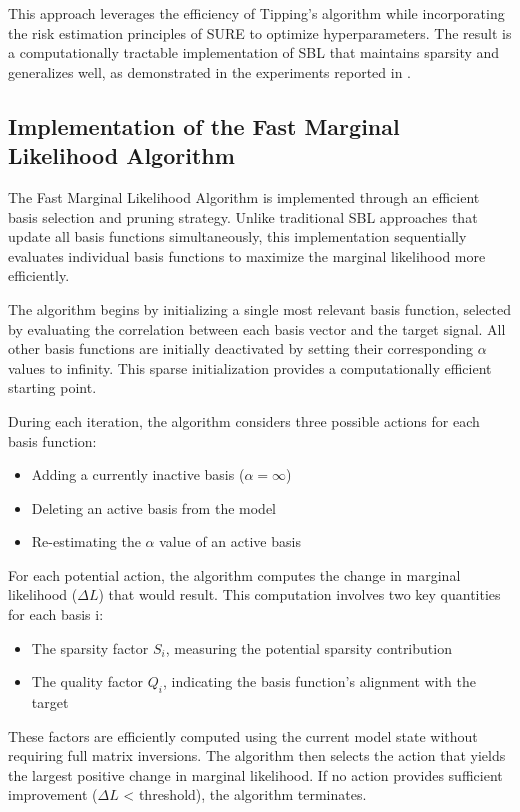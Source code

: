 \documentclass{article}
\begin{document}
This approach leverages the efficiency of Tipping's algorithm while incorporating the risk estimation principles of SURE to optimize hyperparameters. The result is a computationally tractable implementation of SBL that maintains sparsity and generalizes well, as demonstrated in the experiments reported in \cite{tipping2003}.

\subsection{Implementation of the Fast Marginal Likelihood Algorithm}

The Fast Marginal Likelihood Algorithm is implemented through an efficient basis selection and pruning strategy. Unlike traditional SBL approaches that update all basis functions simultaneously, this implementation sequentially evaluates individual basis functions to maximize the marginal likelihood more efficiently.

The algorithm begins by initializing a single most relevant basis function, selected by evaluating the correlation between each basis vector and the target signal. All other basis functions are initially deactivated by setting their corresponding $\alpha$ values to infinity. This sparse initialization provides a computationally efficient starting point.

During each iteration, the algorithm considers three possible actions for each basis function:
\begin{itemize}
\item Adding a currently inactive basis ($\alpha = \infty$)
\item Deleting an active basis from the model
\item Re-estimating the $\alpha$ value of an active basis
\end{itemize}

For each potential action, the algorithm computes the change in marginal likelihood ($\Delta L$) that would result. This computation involves two key quantities for each basis i:
\begin{itemize}
\item The sparsity factor $S_i$, measuring the potential sparsity contribution
\item The quality factor $Q_i$, indicating the basis function's alignment with the target
\end{itemize}

These factors are efficiently computed using the current model state without requiring full matrix inversions. The algorithm then selects the action that yields the largest positive change in marginal likelihood. If no action provides sufficient improvement ($\Delta L$ < threshold), the algorithm terminates.
\end{document}
